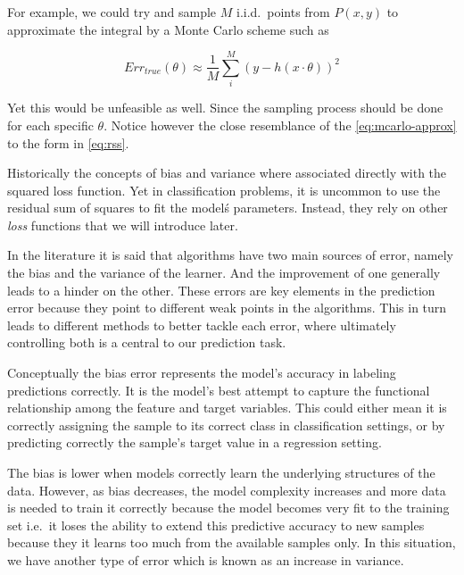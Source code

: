 For example, we could try and sample $M$ i.i.d.\ points from $P(x,y)$ to approximate the integral by a Monte Carlo scheme such as

\begin{equation}\label{eq:mcarlo-approx}
Err_{true}(\theta) \approx \frac{1}{M} \sum_i^M {( y - h(x \cdot \theta) )}^2
\end{equation}

Yet this would be unfeasible as well.
Since the sampling process should be done for each specific $\theta$.
Notice however the close resemblance of the \cref{eq:mcarlo-approx} to the form in \cref{eq:rss}.

Historically the concepts of bias and variance where associated directly with the squared loss function.
 Yet in classification problems, it is uncommon to use the residual sum of squares to fit the model\'s parameters.
Instead, they rely on other \textit{loss} functions that we will introduce later.

%


In the literature it is said that algorithms have two main sources of error, namely the bias and the variance of the learner.
And the improvement of one generally leads to a hinder on the other.
These errors are key elements in the prediction error because they point to different weak points in the algorithms.
This in turn leads to different methods to better tackle each error, where ultimately controlling both is a central to our prediction task.

Conceptually the bias error represents the model's accuracy in labeling predictions correctly.
It is the model's best attempt to capture the functional relationship among the feature and target variables.
This could either mean it is correctly assigning the sample to its correct class in classification settings, or by predicting correctly the sample's target value in a regression setting.

The bias is lower when models correctly learn the underlying structures of the data.
However, as bias decreases, the model complexity increases and more data is needed to train it correctly because the model becomes very fit to the training set i.e.\ it loses the ability to extend this predictive accuracy to new samples because they it learns too much from the available samples only.
In this situation, we have another type of error which is known as an increase in variance.

